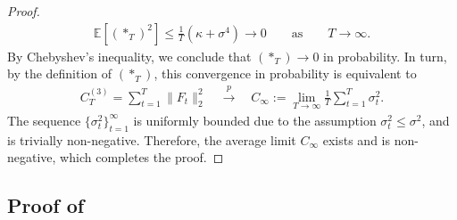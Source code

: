 \documentclass[a4paper, 11pt]{article}
\newcommand{\E}{\mathbb E}
\theoremstyle{definition}
\begin{document}
\begin{proof}
	\begin{align}
		\E\left[ (*_T)^2 \right] \le \frac{ 1 }{ T } \left( \kappa + \sigma^4 \right) \longrightarrow 0 \qquad \text{as} \qquad T \to \infty .
	\end{align}
    By Chebyshev's inequality, we conclude that $(*_T) \to 0$ in probability.
    In turn, by the definition of $(*_T)$, this convergence in probability is equivalent to
	\begin{align}
		C_T^{(3)} = \sum_{t=1}^{T} \| F_t \|_2^2 \quad \overset{p}{\longrightarrow} \quad C_\infty := \lim_{T \to \infty} \frac{1}{T} \sum_{t=1}^{T} \sigma_t^2 .
	\end{align}
	The sequence $\{ \sigma_t^2 \}_{t=1}^{\infty}$ is uniformly bounded due to the assumption $\sigma_t^2 \le \sigma^2$, and is trivially non-negative.
	Therefore, the average limit $C_\infty$ exists and is non-negative, which completes the proof.
\end{proof}




\subsection{Proof of } \label{apx:proof_uniform_convergence}
\end{document}
